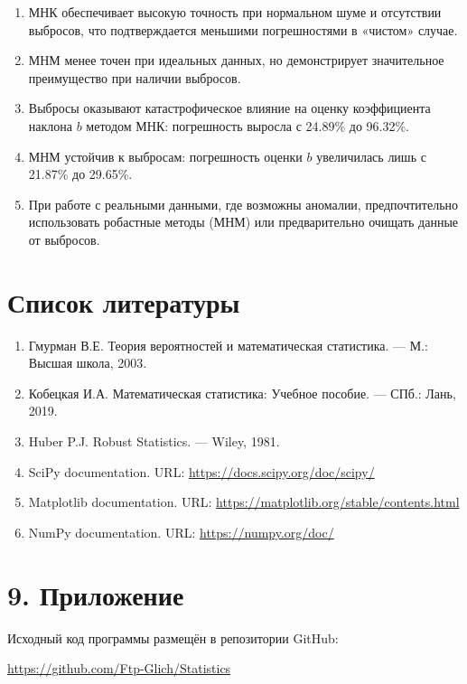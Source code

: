 \documentclass[12pt, a4paper]{article}
\begin{document}
\begin{enumerate}
    \item МНК обеспечивает высокую точность при нормальном шуме и отсутствии выбросов, что подтверждается меньшими погрешностями в «чистом» случае.
    
    \item МНМ менее точен при идеальных данных, но демонстрирует значительное преимущество при наличии выбросов.
    
    \item Выбросы оказывают катастрофическое влияние на оценку коэффициента наклона $b$ методом МНК: погрешность выросла с 24.89\% до 96.32\%.
    
    \item МНМ устойчив к выбросам: погрешность оценки $b$ увеличилась лишь с 21.87\% до 29.65\%.
    
    \item При работе с реальными данными, где возможны аномалии, предпочтительно использовать робастные методы (МНМ) или предварительно очищать данные от выбросов.
\end{enumerate}

\section*{Список литературы}

\begin{enumerate}
    \item Гмурман В.Е. Теория вероятностей и математическая статистика. — М.: Высшая школа, 2003.
    
    \item Кобецкая И.А. Математическая статистика: Учебное пособие. — СПб.: Лань, 2019.
    
    \item Huber P.J. Robust Statistics. — Wiley, 1981.
    
    \item SciPy documentation. URL: \url{https://docs.scipy.org/doc/scipy/}
    
    \item Matplotlib documentation. URL: \url{https://matplotlib.org/stable/contents.html}
    
    \item NumPy documentation. URL: \url{https://numpy.org/doc/}
\end{enumerate}

\section*{9. Приложение}

Исходный код программы размещён в репозитории GitHub:

\url{https://github.com/Ftp-Glich/Statistics}
\end{document}
